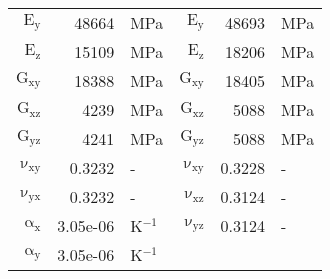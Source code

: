 \documentclass[a4paper,landscape,oneside,11pt,twocolumn]{memoir}
\begin{document}
\begin{table}[!htbp]
\begin{tabular}[t]{rrlrrl}
      $\mathrm{E_y}$ &    48664 & MPa & $\mathrm{E_y}$ &    48693 & MPa\\
      $\mathrm{E_z}$ &    15109 & MPa & $\mathrm{E_z}$ &    18206 & MPa\\
      $\mathrm{G_{xy}}$ &    18388 & MPa & $\mathrm{G_{xy}}$ &    18405 & MPa\\
      $\mathrm{G_{xz}}$ &     4239 & MPa & $\mathrm{G_{xz}}$ &     5088 & MPa\\
      $\mathrm{G_{yz}}$ &     4241 & MPa &  $\mathrm{G_{yz}}$ &     5088 & MPa\\
      $\mathrm{\nu_{xy}}$ & 0.3232 &- &$\mathrm{\nu_{xy}}$ & 0.3228 &-\\
      $\mathrm{\nu_{yx}}$ & 0.3232 &- & $\mathrm{\nu_{xz}}$ & 0.3124 &-\\
      $\mathrm{\alpha_x}$ & 3.05e-06 & K$^{-1}$ &$\mathrm{\nu_{yz}}$ & 0.3124 &-\\
      $\mathrm{\alpha_y}$ & 3.05e-06 & K$^{-1}$\\
      \bottomrule
    \end{tabular}
\end{table}
\end{document}
